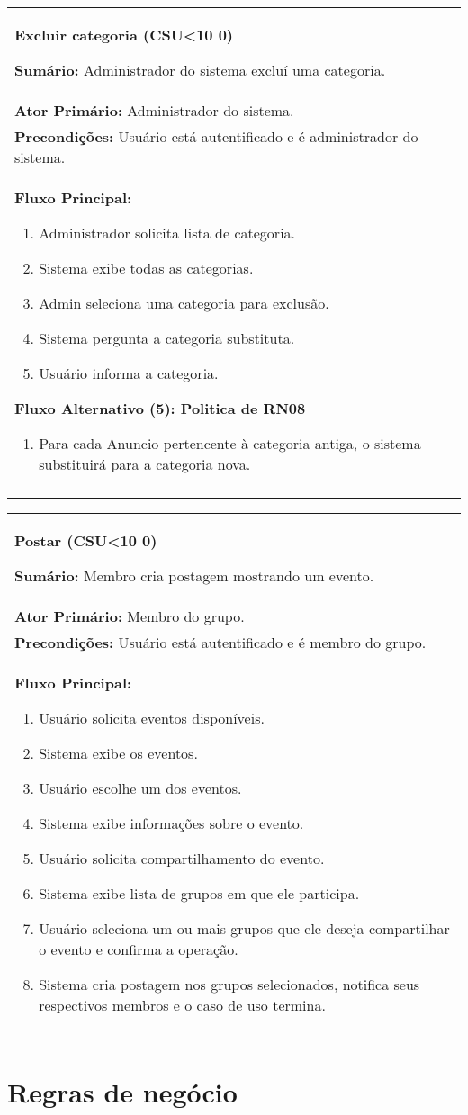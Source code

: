 \documentclass{article}
\newcounter{cscounter}
\newcommand{\sumario}[1] {\textbf{Sumário:} #1\\ }
\newcommand{\ator}[1] {\textbf{Ator Primário:} #1\\}
\newcommand{\precond}[1] {\textbf{Precondições:} #1\\}
\newcommand{\fluxo}{\textbf{Fluxo Principal:}}
\newenvironment{fluxoa}[2]
	{
		\textbf{Fluxo Alternativo (#1): #2}
		\begin{enumerate}[itemsep=0mm, label=(\alph*)]			
	}
	{
		\end{enumerate}			
	}
\newenvironment{casosdeuso}[1]
{
 \stepcounter{cscounter}
 \begin{center}
 \begin{tabular}{|p{\textwidth}|}
 \hline
 \begin{center}
 \large \textbf{#1 (CSU\ifnum\value{cscounter}<10 0\fi\arabic{cscounter})}
 \end{center}
}
{ 
 \\\\\hline
 \end{tabular} 
 \end{center}
}
\begin{document}
\begin{casosdeuso}{Excluir categoria}
 \sumario{Administrador do sistema excluí uma categoria.}
 \ator{Administrador do sistema.}
 \precond{Usuário está autentificado e é administrador do sistema.}
\fluxo
\begin{enumerate}[itemsep=0mm]
 \item Administrador solicita lista de categoria.
 \item Sistema exibe todas as categorias.
 \item Admin seleciona uma categoria  para exclusão.
 \item Sistema pergunta a categoria substituta.
 \item Usuário informa a categoria.
 \end{enumerate}
 \begin{fluxoa}{5}{Politica de RN08}
  \item Para cada Anuncio pertencente à categoria antiga, o sistema substituirá para a categoria nova.
  \end{fluxoa}
\end{casosdeuso}

\begin{casosdeuso}{Postar}
 \sumario{Membro cria postagem mostrando um evento.}
 \ator{Membro do grupo.}
 \precond{Usuário está autentificado e é membro do grupo.}
\fluxo
\begin{enumerate}[itemsep=0mm]
 \item Usuário solicita eventos disponíveis.
 \item Sistema exibe os eventos.
 \item Usuário escolhe um dos eventos.
 \item Sistema exibe informações sobre o evento.
 \item Usuário solicita compartilhamento do evento.
 \item Sistema exibe lista de grupos em que ele participa.
 \item Usuário seleciona um ou mais grupos que ele deseja compartilhar o evento e confirma a operação.
 \item Sistema cria postagem nos grupos selecionados, notifica seus respectivos membros e o caso de uso termina.
\end{enumerate}
\end{casosdeuso}

\section{Regras de negócio} 
\end{document}
